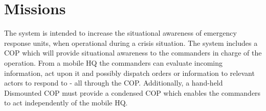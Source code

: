 \section{Missions}
The system is intended to increase the situational awareness of emergency response units, when operational during a crisis situation. The system includes a COP which will provide situational awareness to the commanders in charge of the operation. From a mobile HQ the commanders can evaluate incoming information, act upon it and possibly dispatch orders or information to relevant actors to respond to - all through the COP. Additionally, a hand-held Dismounted COP must provide a condensed COP which enables the commanders to act independently of the mobile HQ.
